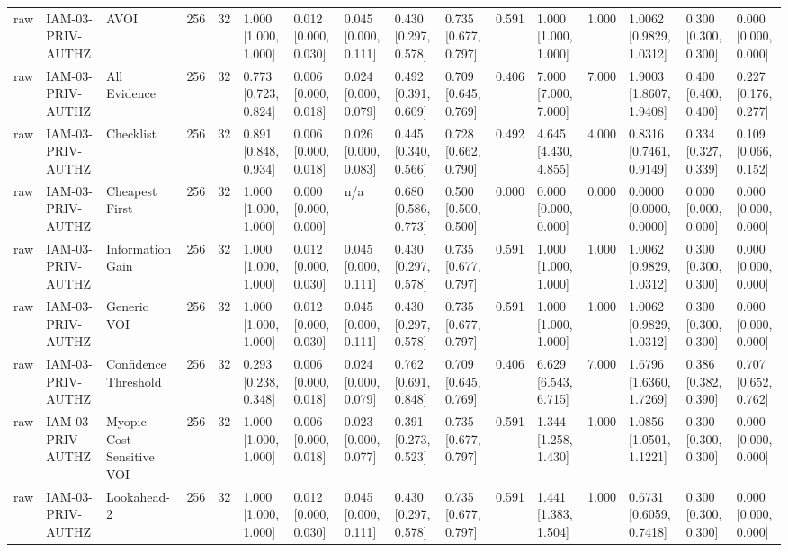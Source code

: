 \begin{table}[!ht]
{\begin{tabular}{llllllllllllllll}
raw & IAM-03-PRIV-AUTHZ & AVOI & 256 & 32 & 1.000 [1.000, 1.000] & 0.012 [0.000, 0.030] & 0.045 [0.000, 0.111] & 0.430 [0.297, 0.578] & 0.735 [0.677, 0.797] & 0.591 & 1.000 [1.000, 1.000] & 1.000 & 1.0062 [0.9829, 1.0312] & 0.300 [0.300, 0.300] & 0.000 [0.000, 0.000] \\
raw & IAM-03-PRIV-AUTHZ & All Evidence & 256 & 32 & 0.773 [0.723, 0.824] & 0.006 [0.000, 0.018] & 0.024 [0.000, 0.079] & 0.492 [0.391, 0.609] & 0.709 [0.645, 0.769] & 0.406 & 7.000 [7.000, 7.000] & 7.000 & 1.9003 [1.8607, 1.9408] & 0.400 [0.400, 0.400] & 0.227 [0.176, 0.277] \\
raw & IAM-03-PRIV-AUTHZ & Checklist & 256 & 32 & 0.891 [0.848, 0.934] & 0.006 [0.000, 0.018] & 0.026 [0.000, 0.083] & 0.445 [0.340, 0.566] & 0.728 [0.662, 0.790] & 0.492 & 4.645 [4.430, 4.855] & 4.000 & 0.8316 [0.7461, 0.9149] & 0.334 [0.327, 0.339] & 0.109 [0.066, 0.152] \\
raw & IAM-03-PRIV-AUTHZ & Cheapest First & 256 & 32 & 1.000 [1.000, 1.000] & 0.000 [0.000, 0.000] & n/a & 0.680 [0.586, 0.773] & 0.500 [0.500, 0.500] & 0.000 & 0.000 [0.000, 0.000] & 0.000 & 0.0000 [0.0000, 0.0000] & 0.000 [0.000, 0.000] & 0.000 [0.000, 0.000] \\
raw & IAM-03-PRIV-AUTHZ & Information Gain & 256 & 32 & 1.000 [1.000, 1.000] & 0.012 [0.000, 0.030] & 0.045 [0.000, 0.111] & 0.430 [0.297, 0.578] & 0.735 [0.677, 0.797] & 0.591 & 1.000 [1.000, 1.000] & 1.000 & 1.0062 [0.9829, 1.0312] & 0.300 [0.300, 0.300] & 0.000 [0.000, 0.000] \\
raw & IAM-03-PRIV-AUTHZ & Generic VOI & 256 & 32 & 1.000 [1.000, 1.000] & 0.012 [0.000, 0.030] & 0.045 [0.000, 0.111] & 0.430 [0.297, 0.578] & 0.735 [0.677, 0.797] & 0.591 & 1.000 [1.000, 1.000] & 1.000 & 1.0062 [0.9829, 1.0312] & 0.300 [0.300, 0.300] & 0.000 [0.000, 0.000] \\
raw & IAM-03-PRIV-AUTHZ & Confidence Threshold & 256 & 32 & 0.293 [0.238, 0.348] & 0.006 [0.000, 0.018] & 0.024 [0.000, 0.079] & 0.762 [0.691, 0.848] & 0.709 [0.645, 0.769] & 0.406 & 6.629 [6.543, 6.715] & 7.000 & 1.6796 [1.6360, 1.7269] & 0.386 [0.382, 0.390] & 0.707 [0.652, 0.762] \\
raw & IAM-03-PRIV-AUTHZ & Myopic Cost-Sensitive VOI & 256 & 32 & 1.000 [1.000, 1.000] & 0.006 [0.000, 0.018] & 0.023 [0.000, 0.077] & 0.391 [0.273, 0.523] & 0.735 [0.677, 0.797] & 0.591 & 1.344 [1.258, 1.430] & 1.000 & 1.0856 [1.0501, 1.1221] & 0.300 [0.300, 0.300] & 0.000 [0.000, 0.000] \\
raw & IAM-03-PRIV-AUTHZ & Lookahead-2 & 256 & 32 & 1.000 [1.000, 1.000] & 0.012 [0.000, 0.030] & 0.045 [0.000, 0.111] & 0.430 [0.297, 0.578] & 0.735 [0.677, 0.797] & 0.591 & 1.441 [1.383, 1.504] & 1.000 & 0.6731 [0.6059, 0.7418] & 0.300 [0.300, 0.300] & 0.000 [0.000, 0.000] \\

\end{tabular}}
\end{table}
